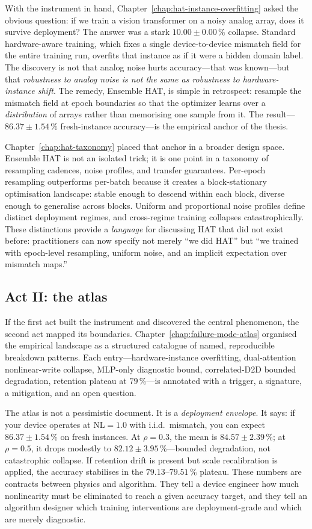 With the instrument in hand, Chapter~\ref{chap:hat-instance-overfitting} asked the obvious question: if we train a vision transformer on a noisy analog array, does it survive deployment?  The answer was a stark $10.00\pm0.00\,\%$ collapse.  Standard hardware-aware training, which fixes a single device-to-device mismatch field for the entire training run, overfits that instance as if it were a hidden domain label.  The discovery is not that analog noise hurts accuracy---that was known---but that \emph{robustness to analog noise is not the same as robustness to hardware-instance shift}.  The remedy, Ensemble HAT, is simple in retrospect: resample the mismatch field at epoch boundaries so that the optimizer learns over a \emph{distribution} of arrays rather than memorising one sample from it.  The result---$86.37\pm1.54\,\%$ fresh-instance accuracy---is the empirical anchor of the thesis.

Chapter~\ref{chap:hat-taxonomy} placed that anchor in a broader design space.  Ensemble HAT is not an isolated trick; it is one point in a taxonomy of resampling cadences, noise profiles, and transfer guarantees.  Per-epoch resampling outperforms per-batch because it creates a block-stationary optimisation landscape: stable enough to descend within each block, diverse enough to generalise across blocks.  Uniform and proportional noise profiles define distinct deployment regimes, and cross-regime training collapses catastrophically.  These distinctions provide a \emph{language} for discussing HAT that did not exist before: practitioners can now specify not merely ``we did HAT'' but ``we trained with epoch-level resampling, uniform noise, and an implicit expectation over mismatch maps.''

\subsection{Act II: the atlas}

If the first act built the instrument and discovered the central phenomenon, the second act mapped its boundaries.  Chapter~\ref{chap:failure-mode-atlas} organised the empirical landscape as a structured catalogue of named, reproducible breakdown patterns.  Each entry---hardware-instance overfitting, dual-attention nonlinear-write collapse, MLP-only diagnostic bound, correlated-D2D bounded degradation, retention plateau at $79\,\%$---is annotated with a trigger, a signature, a mitigation, and an open question.

The atlas is not a pessimistic document.  It is a \emph{deployment envelope}.  It says: if your device operates at $\mathrm{NL}=1.0$ with i.i.d.~mismatch, you can expect $86.37\pm1.54\,\%$ on fresh instances.  At $\rho=0.3$, the mean is $84.57\pm2.39\,\%$; at $\rho=0.5$, it drops modestly to $82.12\pm3.95\,\%$---bounded degradation, not catastrophic collapse.  If retention drift is present but scale recalibration is applied, the accuracy stabilises in the $79.13$--$79.51\,\%$ plateau.  These numbers are contracts between physics and algorithm.  They tell a device engineer how much nonlinearity must be eliminated to reach a given accuracy target, and they tell an algorithm designer which training interventions are deployment-grade and which are merely diagnostic.

